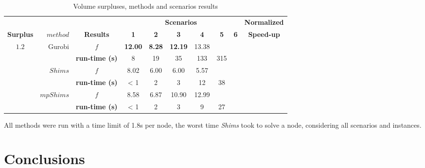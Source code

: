 \documentclass[preprint,authoryear]{elsarticle}
\begin{document}
\begin{table}[H]
\centering
\caption{Volume surpluses, methods and scenarios results}  \label{tab:results}
\footnotesize
\begin{tabular}{crcccccccc}
\toprule
&                       &                       &\multicolumn{6}{c}{\bf Scenarios}              &{\bf Normalized}\\
\cmidrule{4-9}		
{\bf Surplus}           & {$method$}            &{\bf Results}       &{\bf 1}      &{\bf 2}    &{\bf 3}      &{\bf 4}     &{\bf 5}    &{\bf 6}&{\bf Speed-up} \\
\toprule

\multirow{6}{*}{$1.2$} &\multirow{2}{*}{ Gurobi}& $f$                & {\bf 12.00} & {\bf 8.28} & {\bf 12.19} &  13.38     &       &       &   \\%
&                                               & {\bf run-time (s)} &  8          &   19       &  35         &  133     &    315   &       &   \\%

\cmidrule{2-10}		                       
&\multirow{2}{*}{ $Shims$}                      & $f$                & 8.02        &  6.00      &  6.00       &  5.57      &       &       &   \\%
&                                               & {\bf run-time (s)} &  < 1        &   2        &    3        &   12       &   38    &       &   \\%

\cmidrule{2-10}		                       
&\multirow{2}{*}{ $mpShims$}                    & $f$                & 8.58        &  6.87      &  10.90      & 12.99 &  {\bf }     &       &   \\%
&                                               & {\bf run-time (s)} &  < 1        &   2        &    3        &  9        &    27   &       &   \\%

\midrule


\bottomrule	

\end{tabular}
\normalsize
\end{table}

All methods were run with a time limit of 1.8s per node, the worst time {\it Shims} took to solve a node, considering all scenarios and instances.

\section{Conclusions}
\label{sec7}
\end{document}
